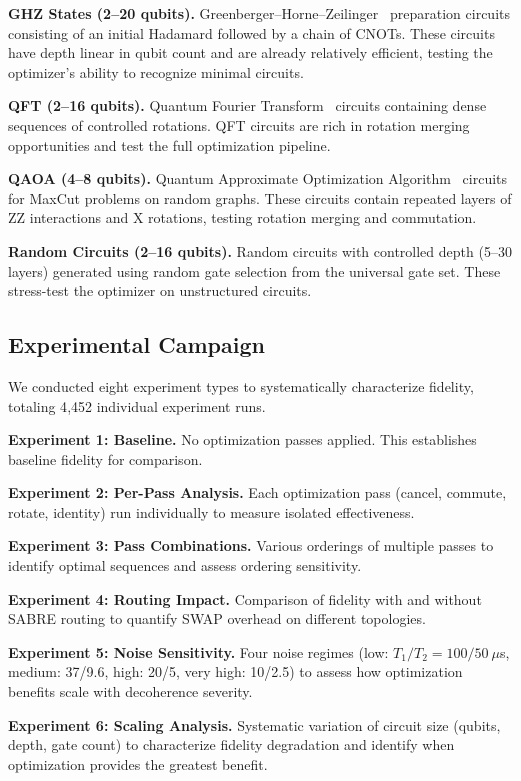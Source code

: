 \documentclass[sigconf,nonacm]{acmart}
\begin{document}
\textbf{GHZ States (2--20 qubits).} Greenberger--Horne--Zeilinger~\cite{greenberger1989bell} preparation circuits consisting of an initial Hadamard followed by a chain of CNOTs. These circuits have depth linear in qubit count and are already relatively efficient, testing the optimizer's ability to recognize minimal circuits.

\textbf{QFT (2--16 qubits).} Quantum Fourier Transform~\cite{nielsen2010quantum} circuits containing dense sequences of controlled rotations. QFT circuits are rich in rotation merging opportunities and test the full optimization pipeline.

\textbf{QAOA (4--8 qubits).} Quantum Approximate Optimization Algorithm~\cite{farhi2014qaoa} circuits for MaxCut problems on random graphs. These circuits contain repeated layers of ZZ interactions and X rotations, testing rotation merging and commutation.

\textbf{Random Circuits (2--16 qubits).} Random circuits with controlled depth (5--30 layers) generated using random gate selection from the universal gate set. These stress-test the optimizer on unstructured circuits.

\subsection{Experimental Campaign}

We conducted eight experiment types to systematically characterize fidelity, totaling 4{,}452 individual experiment runs.

\textbf{Experiment 1: Baseline.} No optimization passes applied. This establishes baseline fidelity for comparison.

\textbf{Experiment 2: Per-Pass Analysis.} Each optimization pass (cancel, commute, rotate, identity) run individually to measure isolated effectiveness.

\textbf{Experiment 3: Pass Combinations.} Various orderings of multiple passes to identify optimal sequences and assess ordering sensitivity.

\textbf{Experiment 4: Routing Impact.} Comparison of fidelity with and without SABRE routing to quantify SWAP overhead on different topologies.

\textbf{Experiment 5: Noise Sensitivity.} Four noise regimes (low: $T_1/T_2 = 100/50\ \mu$s, medium: 37/9.6, high: 20/5, very high: 10/2.5) to assess how optimization benefits scale with decoherence severity.

\textbf{Experiment 6: Scaling Analysis.} Systematic variation of circuit size (qubits, depth, gate count) to characterize fidelity degradation and identify when optimization provides the greatest benefit.
\end{document}
